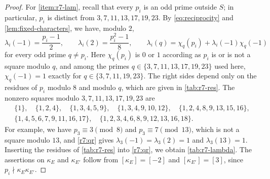 \documentclass[12pt,oneside,openany]{book}
\theoremstyle{definition}
\theoremstyle{plain}
\numberwithin{equation}{chapter}
\theoremstyle{plain}
\theoremstyle{definition}
\theoremstyle{remark}
\newcommand{\sq}[1]{[#1]}
\begin{document}
\begin{proof}
For \ref{item:r7-lam}, recall that every $p_i$ is an odd prime outside $S$;
in particular, $p_i$ is distinct from $3,7,11,13,17,19,23$. By \eqref{eq:reciprocity} and
\cref{lem:fixed-characters}, we have, modulo $2$,
\begin{equation}\label{r7:qr}
 \lambda_i(-1)=\frac{p_i-1}2,\qquad \lambda_i(2)=\frac{p_i^2-1}8,\qquad
 \lambda_i(q)=\chi_q(p_i)+\lambda_i(-1)\chi_q(-1)
\end{equation}
for every odd prime $q\ne p_i$. Here $\chi_q(p_i)$ is $0$ or $1$
according as $p_i$ is or is not a square modulo $q$, and among the primes
$q\in\{3,7,11,13,17,19,23\}$ used here, $\chi_q(-1)=1$ exactly for
$q\in\{3,7,11,19,23\}$. The right sides depend only on the residues of $p_i$
modulo $8$ and modulo $q$, which are given in \cref{tab:r7-res}. The nonzero
squares modulo $3,7,11,13,17,19,23$ are
\[
\begin{gathered}
 \{1\},\quad \{1,2,4\},\quad \{1,3,4,5,9\},\quad \{1,3,4,9,10,12\},\quad
 \{1,2,4,8,9,13,15,16\},\\
 \{1,4,5,6,7,9,11,16,17\},\quad \{1,2,3,4,6,8,9,12,13,16,18\}.
\end{gathered}
\]
For example, we have $p_3\equiv3\pmod8$ and $p_3\equiv7\pmod{13}$, which is
not a square modulo $13$, and \eqref{r7:qr} gives
$\lambda_3(-1)=\lambda_3(2)=1$ and $\lambda_3(13)=1$. Inserting the residues of \cref{tab:r7-res} into
\eqref{r7:qr}, we obtain \cref{tab:r7-lambda}. The assertions on
$\kappa_E$ and $\kappa_{E'}$ follow from $\sq{\kappa_E}=\sq{-2}$ and
$\sq{\kappa_{E'}}=\sq3$, since $p_i\nmid\kappa_E\kappa_{E'}$.


\end{proof}
\end{document}
